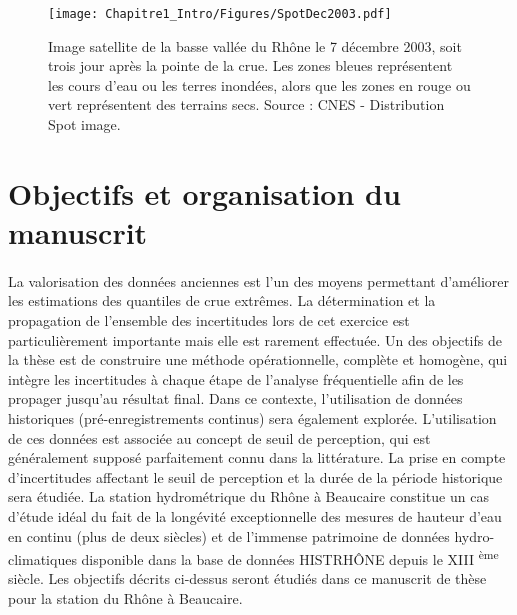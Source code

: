 \begin{figure}[h]
	\centering
	\texttt{[image: Chapitre1\_Intro/Figures/SpotDec2003.pdf]}	
	\caption{Image satellite de la basse vallée du Rhône le 7 décembre 2003, soit trois jour après la pointe de la crue. Les zones bleues représentent les cours d'eau ou les terres inondées, alors que les zones en rouge ou vert représentent des terrains secs. Source : CNES - Distribution Spot image.}
	\label{fig:Spot}
\end{figure}

\FloatBarrier
\newpage
	\section*{Objectifs et organisation du manuscrit}
%

	\paragraph{} La valorisation des données anciennes est l'un des moyens permettant d'améliorer les estimations des quantiles de crue extrêmes. La détermination et la propagation de l'ensemble des incertitudes lors de cet exercice est particulièrement importante mais elle est rarement effectuée. Un des objectifs de la thèse est de construire une méthode opérationnelle, complète et homogène, qui intègre les incertitudes à chaque étape de l'analyse fréquentielle afin de les propager jusqu'au résultat final. Dans ce contexte, l'utilisation de données historiques (pré-enregistrements continus) sera également explorée. L'utilisation de ces données est associée au concept de seuil de perception, qui est généralement supposé parfaitement connu dans la littérature. La prise en compte d'incertitudes affectant le seuil de perception et la durée de la période historique sera étudiée. La station hydrométrique du Rhône à Beaucaire constitue un cas d'étude idéal du fait de la longévité exceptionnelle des mesures de hauteur d'eau en continu (plus de deux siècles) et de l'immense patrimoine de données hydro-climatiques disponible dans la base de données HISTRHÔNE depuis le XIII \textsuperscript{ème} siècle. Les objectifs décrits ci-dessus seront étudiés dans ce manuscrit de thèse pour la station du Rhône à Beaucaire.
	
